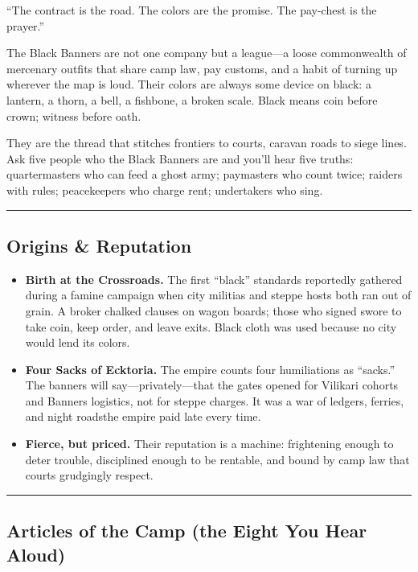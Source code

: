 \documentclass[11pt]{article}
\begin{document}
``The contract is the road. The colors are the promise. The pay-chest is the prayer.''

The Black Banners are not one company but a league---a loose commonwealth of mercenary outfits that share camp law, pay customs, and a habit of turning up wherever the map is loud. Their colors are always some device on black: a lantern, a thorn, a bell, a fishbone, a broken scale. Black means coin before crown; witness before oath.

They are the thread that stitches frontiers to courts, caravan roads to siege lines. Ask five people who the Black Banners are and you'll hear five truths: quartermasters who can feed a ghost army; paymasters who count twice; raiders with rules; peacekeepers who charge rent; undertakers who sing.

\rule{\textwidth}{0.4pt}

\subsection*{Origins \& Reputation}

\begin{itemize}
    \item \textbf{Birth at the Crossroads.} The first ``black'' standards reportedly gathered during a famine campaign when city militias and steppe hosts both ran out of grain. A broker chalked clauses on wagon boards; those who signed swore to take coin, keep order, and leave exits. Black cloth was used because no city would lend its colors.
    
    \item \textbf{Four Sacks of Ecktoria.} The empire counts four humiliations as ``sacks.'' The banners will say---privately---that the gates opened for Vilikari cohorts and Banners logistics, not for steppe charges. It was a war of ledgers, ferries, and night roads\dotsand the empire paid late every time.
    
    \item \textbf{Fierce, but priced.} Their reputation is a machine: frightening enough to deter trouble, disciplined enough to be rentable, and bound by camp law that courts grudgingly respect.
\end{itemize}

\rule{\textwidth}{0.4pt}

\subsection*{Articles of the Camp (the Eight You Hear Aloud)}
\end{document}
